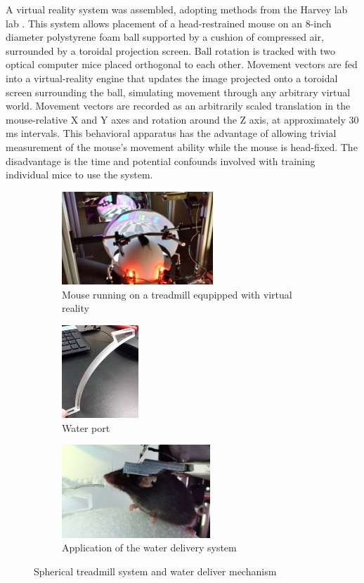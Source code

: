 A virtual reality system was assembled, adopting methods from the Harvey lab lab \cite{Harvey_2009}.
This system allows placement of a head-restrained mouse on an 8-inch diameter polystyrene foam ball supported by a cushion of compressed air, surrounded by a toroidal projection screen.
Ball rotation is tracked with two optical computer mice placed orthogonal to each other.
Movement vectors are fed into a virtual-reality engine that updates the image projected onto a toroidal screen surrounding the ball, simulating movement through any arbitrary virtual world.
Movement vectors are recorded as an arbitrarily scaled translation in the mouse-relative X and Y axes and rotation around the Z axis, at approximately 30 ms intervals.
This behavioral apparatus has the advantage of allowing trivial measurement of the mouse's movement ability while the mouse is head-fixed.
The disadvantage is the time and potential confounds involved with training individual mice to use the system.

\begin{figure}[htb]
	\begin{subfigure}[t]{0.32\linewidth}\centering
		\includegraphics[height=3.5cm]{figures/01-treadmill-mouse-running.jpg}
		\caption{Mouse running on a treadmill equpipped with virtual reality}
	\end{subfigure}
	\hfill
	\begin{subfigure}[t]{0.15\linewidth}\centering
		\includegraphics[height=3.5cm]{figures/01-water-port.jpg}
		\caption{Water port}
	\end{subfigure}
	\begin{subfigure}[t]{0.45\linewidth}\centering
		\includegraphics[height=3.5cm]{figures/03-water-delivery-zoom.jpg}
		\caption{Application of the water delivery system}
	\end{subfigure}
	\caption{Spherical treadmill system and water deliver mechanism}
	\label{fig:spherical-treadmill-water-delivery}
\end{figure}

